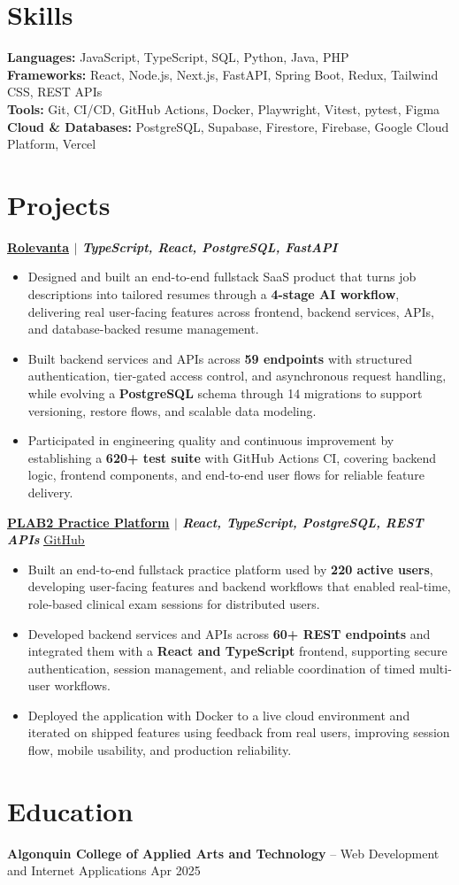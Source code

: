 \documentclass[11pt]{article}       %
\newcommand{\resumeItem}[1]{
  \item #1
}
\newcommand{\resumeProjectHeading}[2]{
\textbf{#1} \hfill #2 \\
\vspace{-9pt}
}
\begin{document}
\vspace{-10.5pt}

\section*{Skills}
\textbf{Languages:} JavaScript, TypeScript, SQL, Python, Java, PHP \\
\textbf{Frameworks:} React, Node.js, Next.js, FastAPI, Spring Boot, Redux, Tailwind CSS, REST APIs \\
\textbf{Tools:} Git, CI/CD, GitHub Actions, Docker, Playwright, Vitest, pytest, Figma \\
\textbf{Cloud \& Databases:} PostgreSQL, Supabase, Firestore, Firebase, Google Cloud Platform, Vercel
\vspace{-5pt}

\section*{Projects}
\resumeProjectHeading{\href{https://rolevanta.com}{\textbf{Rolevanta}} $|$ \emph{TypeScript, React, PostgreSQL, FastAPI}}{}
\begin{itemize}
  \resumeItem{Designed and built an end-to-end fullstack SaaS product that turns job descriptions into tailored resumes through a \textbf{4-stage AI workflow}, delivering real user-facing features across frontend, backend services, APIs, and database-backed resume management.}
  \resumeItem{Built backend services and APIs across \textbf{59 endpoints} with structured authentication, tier-gated access control, and asynchronous request handling, while evolving a \textbf{PostgreSQL} schema through 14 migrations to support versioning, restore flows, and scalable data modeling.}
  \resumeItem{Participated in engineering quality and continuous improvement by establishing a \textbf{620+ test suite} with GitHub Actions CI, covering backend logic, frontend components, and end-to-end user flows for reliable feature delivery.}
\end{itemize}

\resumeProjectHeading{\href{https://plab2practice.com}{\textbf{PLAB2 Practice Platform}} $|$ \emph{React, TypeScript, PostgreSQL, REST APIs}}{\href{https://github.com/altansaid/plab2projectnew}{\underline{GitHub}}}
\begin{itemize}
  \resumeItem{Built an end-to-end fullstack practice platform used by \textbf{220 active users}, developing user-facing features and backend workflows that enabled real-time, role-based clinical exam sessions for distributed users.}
  \resumeItem{Developed backend services and APIs across \textbf{60+ REST endpoints} and integrated them with a \textbf{React and TypeScript} frontend, supporting secure authentication, session management, and reliable coordination of timed multi-user workflows.}
  \resumeItem{Deployed the application with Docker to a live cloud environment and iterated on shipped features using feedback from real users, improving session flow, mobile usability, and production reliability.}
\end{itemize}

\section*{Education}
\textbf{Algonquin College of Applied Arts and Technology} -- Web Development and Internet Applications
\hfill Apr 2025 \\
\end{document}
